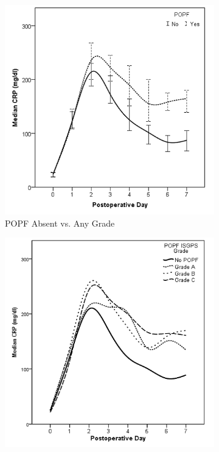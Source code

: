 
\clearpage
\begin{figure}[htbp]
	\centering
	\begin{subfigure}{0.45\textwidth}
		\centering
		\includegraphics[width=\textwidth]{Figures/crp_comp_crp_popf_yes_no}
		\caption{POPF Absent vs. Any Grade}
		\label{fig:crp_comp_crp_popf_yes_no}
	\end{subfigure}
	\begin{subfigure}{0.45\textwidth}
		\centering
		\includegraphics[width=\textwidth]{Figures/crp_comp_crp_popf_isgps}

\end{subfigure}
\end{figure}
